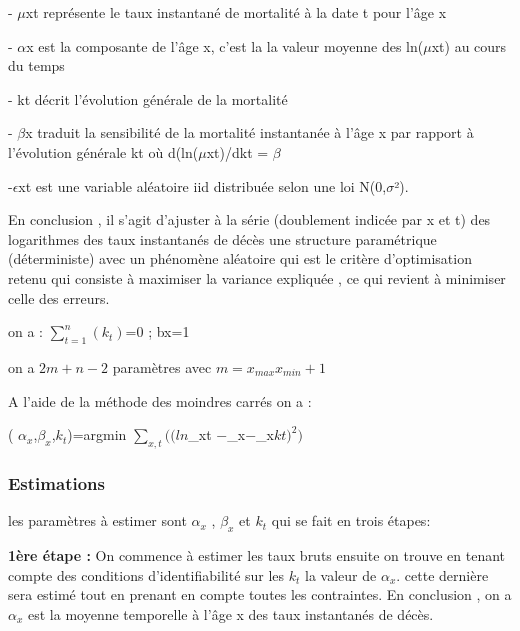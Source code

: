 \documentclass{article}
\begin{document}
{{\large - $\mu$xt représente le taux instantané de mortalité à la date t pour l’âge x}

{\large - $\alpha$x est la composante de l’âge x, c'est la  la valeur moyenne des ln($\mu$xt) au cours du temps}

{\large - kt décrit l’évolution générale de la mortalité}

{\large - $\beta$x traduit la sensibilité de la mortalité instantanée à l’âge x par rapport à
l’évolution générale kt où d(ln($\mu$xt)/dkt = $\beta$}

{\large -$\epsilon$xt est une variable aléatoire iid distribuée selon une loi N(0,$\sigma$²).}

{\large En conclusion , il s'agit d’ajuster à la série (doublement indicée par x et t) des
logarithmes des taux instantanés de décès une structure paramétrique (déterministe) avec un phénomène aléatoire qui est  le critère
d’optimisation retenu qui consiste à maximiser la variance expliquée , ce qui revient à minimiser celle des erreurs.}

\begin{center}
    {\large on a : $\sum_{t=1}^{n} (k_{t})$=0 ; b{x}=1
}
\end{center}

{\large  on a $ 2m + n - 2$ paramètres avec $m=x_{max}x_{min}+1$ }

{\large A l'aide de la méthode des moindres carrés on a :}

\begin{center}
    {\large  ( $\alpha_{x}$,$\beta_{x}$,$k_{t}$)=argmin $\sum_{x,t}((ln $\mu_{xt} $ -$\alpha_{x}$-$\beta_{x}$kt)^2)$   }
\end{center}

\subsubsection{Estimations}
{\large  les paramètres à estimer sont $\alpha_{x}$ , $\beta_{x} $ et $k_{t}$ qui se fait en trois étapes: }

{\large \textbf{1ère étape :}}
{\large On commence à estimer les taux bruts ensuite on trouve en tenant compte des conditions d'identifiabilité sur les $k_{t}$ la valeur de $\alpha_{x}$. cette dernière sera estimé tout en prenant en compte toutes les contraintes.
En conclusion , on a $\alpha_{x}$ est la moyenne  temporelle à l'âge x des taux instantanés de décès. }

}
\end{document}
